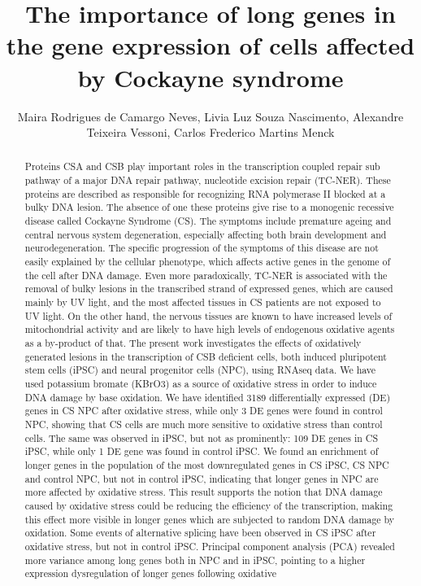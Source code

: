 \documentclass[twoside]{article}
\title{\vspace{-15mm}\fontsize{24pt}{10pt}\selectfont\textbf{ The importance of long genes in the gene expression of cells affected by Cockayne syndrome }} %
\author{ Maira Rodrigues de Camargo Neves, Livia Luz Souza Nascimento, Alexandre Teixeira Vessoni, Carlos Frederico Martins Menck }
\affil{ Department of Microbiology,  Institute of Biomedical Sciences,  University of S\~ao Paulo,  S\~ao Paulo/SP,  Brazil }
\date{}
\begin{document}
  
  
  \maketitle %
  
  
  \thispagestyle{fancy} %
  
  
  \begin{abstract}
  Proteins CSA and CSB play important roles in the transcription coupled repair sub pathway of a major DNA repair pathway,  nucleotide excision repair (TC-NER). These proteins are described as responsible for recognizing RNA polymerase II blocked at a bulky DNA lesion. The absence of one these proteins give rise to a monogenic recessive disease called Cockayne Syndrome (CS). The symptoms include premature ageing and central nervous system degeneration,  especially affecting both brain development and neurodegeneration. The specific progression of the symptoms of this disease are not easily explained by the cellular phenotype,  which affects active genes in the genome of the cell after DNA damage. Even more paradoxically,  TC-NER is associated with the removal of bulky lesions in the transcribed strand of expressed genes,  which are caused mainly by UV light,  and the most affected tissues in CS patients are not exposed to UV light. On the other hand,  the nervous tissues are known to have increased levels of mitochondrial activity and are likely to have high levels of endogenous oxidative agents as a by-product of that. The present work investigates the effects of oxidatively generated lesions in the transcription of CSB deficient cells,  both induced pluripotent stem cells (iPSC) and neural progenitor cells (NPC),  using RNAseq data. We have used potassium bromate (KBrO3) as a source of oxidative stress in order to induce DNA damage by base oxidation. We have identified 3189 differentially expressed (DE) genes in CS NPC after oxidative stress,  while only 3 DE genes were found in control NPC,  showing that CS cells are much more sensitive to oxidative stress than control cells. The same was observed in iPSC,  but not as prominently: 109 DE genes in CS iPSC,  while only 1 DE gene was found in control iPSC. We found an enrichment of longer genes in the population of the most downregulated genes in CS iPSC,  CS NPC and control NPC,  but not in control iPSC,  indicating that longer genes in NPC are more affected by oxidative stress. This result supports the notion that DNA damage caused by oxidative stress could be reducing the efficiency of the transcription,  making this effect more visible in longer genes which are subjected to random DNA damage by oxidation. Some events of alternative splicing have been observed in CS iPSC after oxidative stress,  but not in control iPSC. Principal component analysis (PCA) revealed more variance among long genes both in NPC and in iPSC,  pointing to a higher expression dysregulation of longer genes following oxidative 
\end{abstract}
\end{document}
